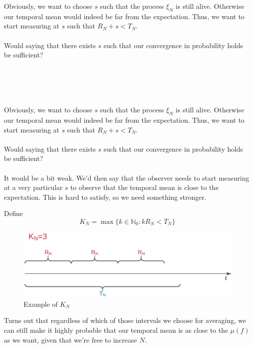 \documentclass{beamer}
\begin{document}
\begin{frame}
    Obviously, we want to choose $s$ such that the process $\xi_N$ is still alive. Otherwise our temporal mean would indeed be far from the expectation. Thus, we want to start measuring at
        $s$ such that $R_N + s < T_N$. \\~\\

        Would saying that there exists $s$ such that our convergence in probability holds be sufficient? \\~\\\textcolor{white}{It would be a bit weak. We'd then say that the observer needs to start measuring at a very particular $s$ to observe that our temporal mean is close to the expectation. This is hard to satisfy, so 
        we need something stronger.}
\end{frame}
\begin{frame}
    Obviously, we want to choose $s$ such that the process $\xi_N$ is still alive. Otherwise our temporal mean would indeed be far from the expectation. Thus, we want to start measuring at
        $s$ such that $R_N + s < T_N$. \\~\\

        Would saying that there exists $s$ such that our convergence in probability holds be sufficient? \\~\\

       It would be a bit weak. We'd then say that the observer needs to start measuring at a very particular $s$ to observe that the temporal mean is close to the expectation. 
       This is hard to satisfy, so 
        we need something stronger.
\end{frame}

\begin{frame}
    Define 
    \[K_N = \max\{k \in \mathbb{N}_0: kR_N < T_N\}\]
    \begin{figure}[H]
        \centering
        \includegraphics[scale=0.2]{./img/kn_rn.png}
        \caption{Example of $K_N$}
        \label{fig:kn_rn}
    \end{figure}
    Turns out that regardless of which of those intervals we choose for averaging, we can still make it highly probable that our temporal mean is as close to the $\mu(f)$ 
    as we want, given that we're free to increase $N$. 
\end{frame}
\end{document}
